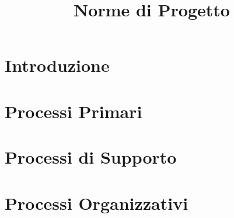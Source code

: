 \documentclass{classes/base}
\title{Norme di Progetto}
\author{\matteo}
\begin{document}
	\maketitle
	\newpage
	
	\newpage
	\tableofcontents
	
	\newpage
	\section{Introduzione}
	
	
	\newpage
	\section{Processi Primari}
	
	
	\newpage
	\section{Processi di Supporto}
	
	
	\newpage
	\section{Processi Organizzativi}
	
	
\end{document}
